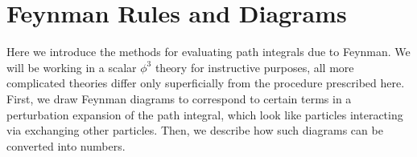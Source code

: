 \documentclass[main.tex]{subfiles}
\begin{document}
\chapter{Feynman Rules and Diagrams}
Here we introduce the methods for evaluating path integrals due to Feynman. We will be working in a scalar $\phi^3$ theory for instructive purposes, all more complicated theories differ only superficially from the procedure prescribed here. First, we draw Feynman diagrams to correspond to certain terms in a perturbation expansion of the path integral, which look like particles interacting via exchanging other particles. Then, we describe how such diagrams can be converted into numbers.
\end{document}

